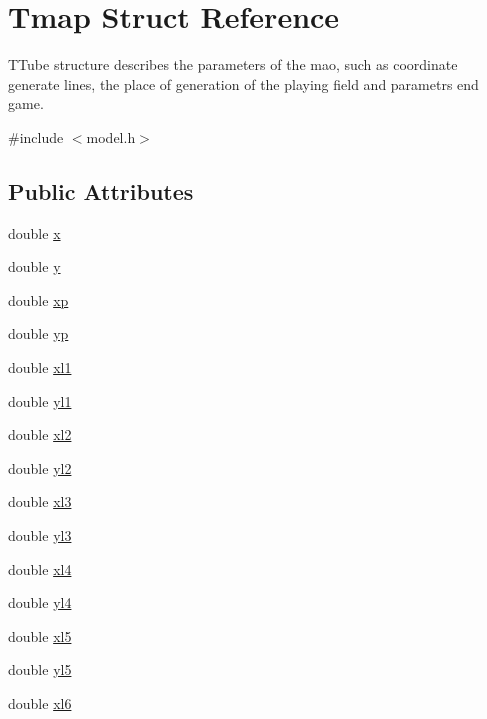\hypertarget{struct_tmap}{}\section{Tmap Struct Reference}
\label{struct_tmap}


T\+Tube structure describes the parameters of the mao, such as coordinate generate lines, the place of generation of the playing field and parametrs end game.  




{\ttfamily \#include $<$model.\+h$>$}

\subsection*{Public Attributes}
\begin{DoxyCompactItemize}
\item 
double \hyperlink{struct_tmap_a20053fbc7a23824b9e4618e239eeaf59}{x}
\item 
double \hyperlink{struct_tmap_a657574a2f2de5ea819f5f4d4049b5c4b}{y}
\item 
double \hyperlink{struct_tmap_a068dfd65c2ecb6af3ddeaf8b7c99bc17}{xp}
\item 
double \hyperlink{struct_tmap_a060ab599d7d4310c5df62d84fcb8479a}{yp}
\item 
double \hyperlink{struct_tmap_a8cb2605c214c040af271abc9dd4491c8}{xl1}
\item 
double \hyperlink{struct_tmap_a716530ae2e5b378e885356c63863c1a8}{yl1}
\item 
double \hyperlink{struct_tmap_abe88e54a6d09a018f04103ae7c196c38}{xl2}
\item 
double \hyperlink{struct_tmap_a00fb94a61d709715d5c3a9a2361dc18c}{yl2}
\item 
double \hyperlink{struct_tmap_a529714b4d9249f784aaf6642aafb46a4}{xl3}
\item 
double \hyperlink{struct_tmap_a1f1766f9a2217c2534c8b92424031709}{yl3}
\item 
double \hyperlink{struct_tmap_a09013aade575f19b3b38311173b1c41a}{xl4}
\item 
double \hyperlink{struct_tmap_addd9c765b017673e9e8cf9e89aa26ea9}{yl4}
\item 
double \hyperlink{struct_tmap_a76c3ef3089548434cac2bbee88493052}{xl5}
\item 
double \hyperlink{struct_tmap_a5bfaab14277cf57ec83b0074ecf16d66}{yl5}
\item 
double \hyperlink{struct_tmap_a58ce8aef068978fa7b1931576ad551fe}{xl6}

\end{DoxyCompactItemize}
